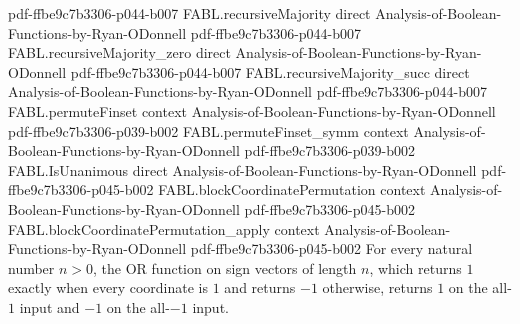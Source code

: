 \begin{theorem}
  {pdf-ffbe9c7b3306-p044-b007}
\proofstep
  {FABL.recursiveMajority}
  {direct}
  {Analysis-of-Boolean-Functions-by-Ryan-ODonnell}
  {pdf-ffbe9c7b3306-p044-b007}
\proofstep
  {FABL.recursiveMajority_zero}
  {direct}
  {Analysis-of-Boolean-Functions-by-Ryan-ODonnell}
  {pdf-ffbe9c7b3306-p044-b007}
\proofstep
  {FABL.recursiveMajority_succ}
  {direct}
  {Analysis-of-Boolean-Functions-by-Ryan-ODonnell}
  {pdf-ffbe9c7b3306-p044-b007}
\proofstep
  {FABL.permuteFinset}
  {context}
  {Analysis-of-Boolean-Functions-by-Ryan-ODonnell}
  {pdf-ffbe9c7b3306-p039-b002}
\proofstep
  {FABL.permuteFinset_symm}
  {context}
  {Analysis-of-Boolean-Functions-by-Ryan-ODonnell}
  {pdf-ffbe9c7b3306-p039-b002}
\proofstep
  {FABL.IsUnanimous}
  {direct}
  {Analysis-of-Boolean-Functions-by-Ryan-ODonnell}
  {pdf-ffbe9c7b3306-p045-b002}
\proofstep
  {FABL.blockCoordinatePermutation}
  {context}
  {Analysis-of-Boolean-Functions-by-Ryan-ODonnell}
  {pdf-ffbe9c7b3306-p045-b002}
\proofstep
  {FABL.blockCoordinatePermutation_apply}
  {context}
  {Analysis-of-Boolean-Functions-by-Ryan-ODonnell}
  {pdf-ffbe9c7b3306-p045-b002}
For every natural number $n>0$, the OR function on sign vectors of length $n$, which
returns $1$ exactly when every coordinate is $1$ and returns $-1$ otherwise, returns $1$
on the all-$1$ input and $-1$ on the all-$-1$ input.
\end{theorem}

